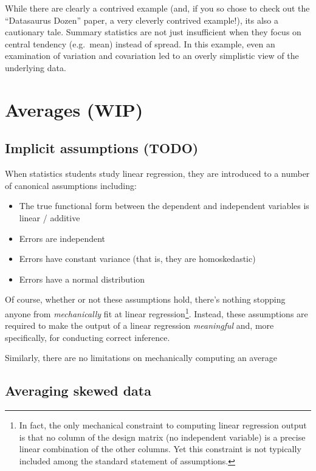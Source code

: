 \documentclass[
]{krantz}
\providecommand{\tightlist}{%
  \setlength{\itemsep}{0pt}\setlength{\parskip}{0pt}}
\begin{document}
While there are clearly a contrived example (and, if you so chose to check out the ``Datasaurus Dozen'' paper, a very cleverly contrived example!), its also a cautionary tale.
Summary statistics are not just insufficient when they focus on central tendency (e.g.~mean) instead of spread.
In this example, even an examination of variation and covariation led to an overly simplistic view of the underlying data.

\hypertarget{averages-wip}{%
\section{Averages (WIP)}\label{averages-wip}}

\hypertarget{implicit-assumptions-todo}{%
\subsection{Implicit assumptions (TODO)}\label{implicit-assumptions-todo}}

When statistics students study linear regression, they are introduced to a number of canonical assumptions including:

\begin{itemize}
\tightlist
\item
  The true functional form between the dependent and independent variables is linear / additive
\item
  Errors are independent
\item
  Errors have constant variance (that is, they are homoskedastic)
\item
  Errors have a normal distribution
\end{itemize}

Of course, whether or not these assumptions hold, there's nothing stopping anyone from \emph{mechanically} fit at linear regression\footnote{In fact, the only mechanical constraint to computing linear regression output is that no column of the design matrix (no independent variable) is a precise linear combination of the other columns. Yet this constraint is not typically included among the standard statement of assumptions.}. Instead, these assumptions are required to make the output of a linear regression \emph{meaningful} and, more specifically, for conducting correct inference.

Similarly, there are no limitations on mechanically computing an average

\hypertarget{averaging-skewed-data}{%
\subsection{Averaging skewed data}\label{averaging-skewed-data}}
\end{document}
